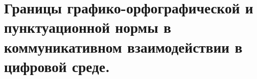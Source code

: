 \section{Границы графико-орфографической и пунктуационной нормы в коммуникативном взаимодействии в цифровой среде.}